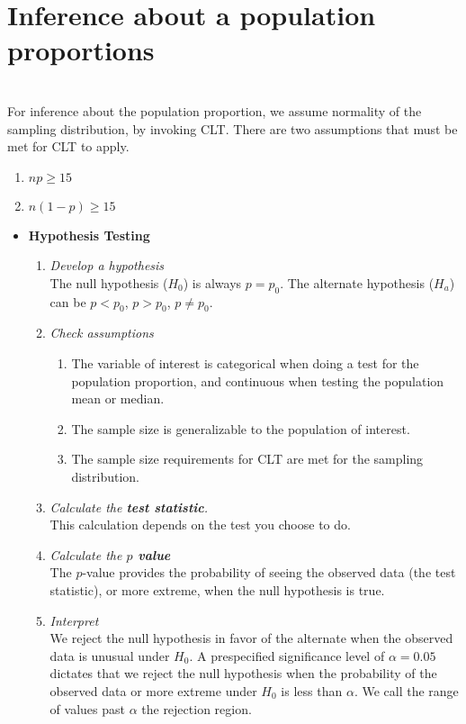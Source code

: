 \documentclass{article}
\begin{document}
\section{Inference about a population proportions} \label{pop-prop}
\\ For inference about the population proportion, we assume normality of the sampling distribution, by invoking CLT. There are two assumptions that must be met for CLT to apply.
  \begin{enumerate}
    \item $np \geq 15$
    \item $n(1-p) \geq 15$
  \end{enumerate}
  \begin{itemize}
    \item \textbf{Hypothesis Testing}
      \begin{enumerate}
        \item \emph{Develop a hypothesis}
          \\The null hypothesis ($H_0$) is always $p=p_0$. The alternate hypothesis ($H_a$) can be $p<p_0$, $p>p_0$, $p\neq p_0$.
        \item \emph{Check assumptions}
          \begin{enumerate}
            \item The variable of interest is categorical when doing a test for the population proportion, and continuous when testing the population mean or median.
            \item The sample size is generalizable to the population of interest.
            \item The sample size requirements for CLT are met for the sampling distribution.
          \end{enumerate}
          \item \emph{Calculate the \textbf{test statistic}.}
          \\ This calculation depends on the test you choose to do.
          \item \emph{Calculate the \textbf{$p$ value}}
          \\ The $p$-value provides the probability of seeing the observed data (the test statistic), or more extreme, when the null hypothesis is true.
          \item \emph{Interpret}
          \\ We reject the null hypothesis in favor of the alternate when the observed data is unusual under $H_0$. A prespecified significance level of $\alpha = 0.05$ dictates that we reject the null hypothesis when the probability of the observed data or more extreme under $H_0$ is less than $\alpha$. We call the range of values past $\alpha$ the rejection region.

\end{enumerate}
\end{itemize}
\end{document}

